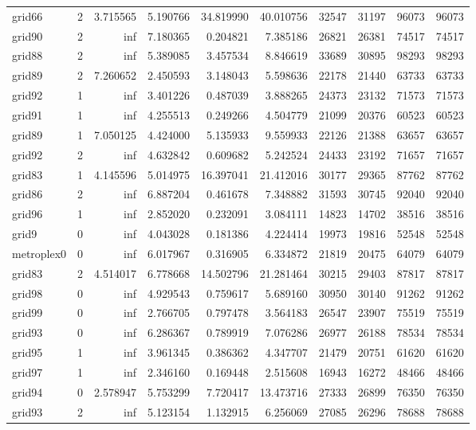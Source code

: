 \begin{longtable}{|l|r|r|r|r|r|r|r|r|r|}
grid66 & 2 & 3.715565 & 5.190766 & 34.819990 & 40.010756 & 32547 & 31197 & 96073 & 96073 \\
grid90 & 2 & inf & 7.180365 & 0.204821 & 7.385186 & 26821 & 26381 & 74517 & 74517 \\
grid88 & 2 & inf & 5.389085 & 3.457534 & 8.846619 & 33689 & 30895 & 98293 & 98293 \\
grid89 & 2 & 7.260652 & 2.450593 & 3.148043 & 5.598636 & 22178 & 21440 & 63733 & 63733 \\
grid92 & 1 & inf & 3.401226 & 0.487039 & 3.888265 & 24373 & 23132 & 71573 & 71573 \\
grid91 & 1 & inf & 4.255513 & 0.249266 & 4.504779 & 21099 & 20376 & 60523 & 60523 \\
grid89 & 1 & 7.050125 & 4.424000 & 5.135933 & 9.559933 & 22126 & 21388 & 63657 & 63657 \\
grid92 & 2 & inf & 4.632842 & 0.609682 & 5.242524 & 24433 & 23192 & 71657 & 71657 \\
grid83 & 1 & 4.145596 & 5.014975 & 16.397041 & 21.412016 & 30177 & 29365 & 87762 & 87762 \\
grid86 & 2 & inf & 6.887204 & 0.461678 & 7.348882 & 31593 & 30745 & 92040 & 92040 \\
grid96 & 1 & inf & 2.852020 & 0.232091 & 3.084111 & 14823 & 14702 & 38516 & 38516 \\
grid9 & 0 & inf & 4.043028 & 0.181386 & 4.224414 & 19973 & 19816 & 52548 & 52548 \\
metroplex0 & 0 & inf & 6.017967 & 0.316905 & 6.334872 & 21819 & 20475 & 64079 & 64079 \\
grid83 & 2 & 4.514017 & 6.778668 & 14.502796 & 21.281464 & 30215 & 29403 & 87817 & 87817 \\
grid98 & 0 & inf & 4.929543 & 0.759617 & 5.689160 & 30950 & 30140 & 91262 & 91262 \\
grid99 & 0 & inf & 2.766705 & 0.797478 & 3.564183 & 26547 & 23907 & 75519 & 75519 \\
grid93 & 0 & inf & 6.286367 & 0.789919 & 7.076286 & 26977 & 26188 & 78534 & 78534 \\
grid95 & 1 & inf & 3.961345 & 0.386362 & 4.347707 & 21479 & 20751 & 61620 & 61620 \\
grid97 & 1 & inf & 2.346160 & 0.169448 & 2.515608 & 16943 & 16272 & 48466 & 48466 \\
grid94 & 0 & 2.578947 & 5.753299 & 7.720417 & 13.473716 & 27333 & 26899 & 76350 & 76350 \\
grid93 & 2 & inf & 5.123154 & 1.132915 & 6.256069 & 27085 & 26296 & 78688 & 78688 \\

\end{longtable}

